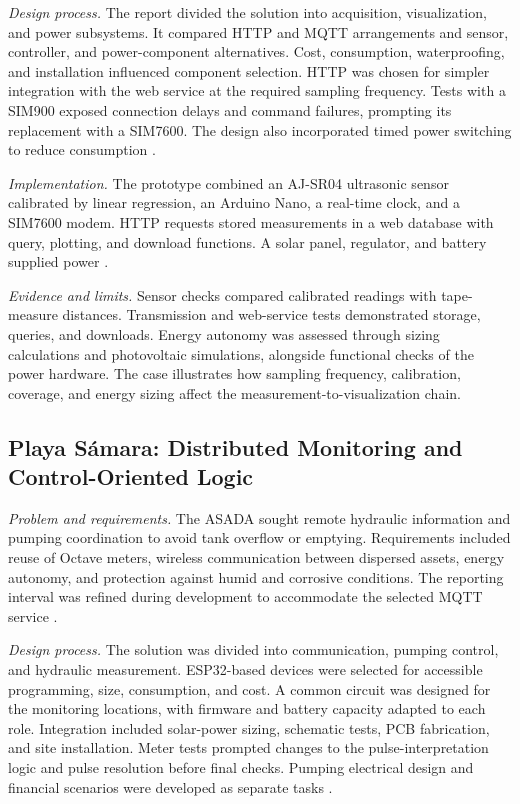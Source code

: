 \documentclass[conference]{IEEEtran}
\begin{document}
\textit{Design process.} The report divided the solution into acquisition, visualization, and power subsystems. It compared HTTP and MQTT arrangements and sensor, controller, and power-component alternatives. Cost, consumption, waterproofing, and installation influenced component selection. HTTP was chosen for simpler integration with the web service at the required sampling frequency. Tests with a SIM900 exposed connection delays and command failures, prompting its replacement with a SIM7600. The design also incorporated timed power switching to reduce consumption \cite[Secs.~4.4--4.6 and 5.1]{chavarria2021implementacion}.

\textit{Implementation.} The prototype combined an AJ-SR04 ultrasonic sensor calibrated by linear regression, an Arduino Nano, a real-time clock, and a SIM7600 modem. HTTP requests stored measurements in a web database with query, plotting, and download functions. A solar panel, regulator, and battery supplied power \cite[Secs.~5.2--5.6]{chavarria2021implementacion}.

\textit{Evidence and limits.} Sensor checks compared calibrated readings with tape-measure distances. Transmission and web-service tests demonstrated storage, queries, and downloads. Energy autonomy was assessed through sizing calculations and photovoltaic simulations, alongside functional checks of the power hardware. The case illustrates how sampling frequency, calibration, coverage, and energy sizing affect the measurement-to-visualization chain.

\subsection{Playa Sámara: Distributed Monitoring and Control-Oriented Logic}
\textit{Problem and requirements.} The ASADA sought remote hydraulic information and pumping coordination to avoid tank overflow or emptying. Requirements included reuse of Octave meters, wireless communication between dispersed assets, energy autonomy, and protection against humid and corrosive conditions. The reporting interval was refined during development to accommodate the selected MQTT service \cite[Secs.~1.3 and 2.1]{solorzano2021sistema}.

\textit{Design process.} The solution was divided into communication, pumping control, and hydraulic measurement. ESP32-based devices were selected for accessible programming, size, consumption, and cost. A common circuit was designed for the monitoring locations, with firmware and battery capacity adapted to each role. Integration included solar-power sizing, schematic tests, PCB fabrication, and site installation. Meter tests prompted changes to the pulse-interpretation logic and pulse resolution before final checks. Pumping electrical design and financial scenarios were developed as separate tasks \cite[Chs.~5--8]{solorzano2021sistema}.
\end{document}
